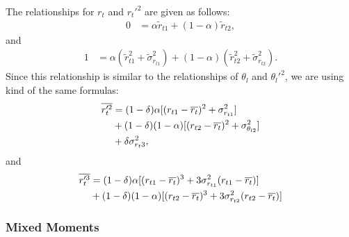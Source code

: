 The relationships for $r_t$ and $r_t'^2$ are given as follows:
\begin{align}
    \label{eq:rt_bar_nondim}
    0 &= \alpha \tilde{r}_{t1} + (1 - \alpha) \tilde{r}_{t2},
\end{align}
and
\begin{align}
    \label{rtptwo_nondim}
    1 &= \alpha \left( \tilde{r}_{t1}^2 + \tilde{\sigma}_{r_{t1}}^2 \right) + (1 - \alpha) \left( \tilde{r}_{t2}^2 + \tilde{\sigma}_{r_{t2}}^2 \right).
\end{align}
Since this relationship is similar to the relationships of $\theta_l$ and $\theta_l'^2$, we are using kind of the same formulas:
\begin{align}
    \label{eq:r_t_prime_2_bar}
    \overline{r_t'^2}
    &= (1 - \delta) \alpha [(r_{t1} - \overline{r_t})^2 + \sigma_{r_{t1}}^2] \nonumber\\
    &+ (1 - \delta) (1 - \alpha) [(r_{t2} - \overline{r_t})^2 + \sigma_{\theta_{l2}}^2] \nonumber\\
    &+ \delta \sigma_{r_t 3}^2,
\end{align}
and
\begin{align}
    \label{eq:r_t_prime_3_bar}
    \overline{r_t'^3}
    &= (1 - \delta) \alpha [(r_{t1} - \overline{r_t})^3 + 3 \sigma_{r_{t1}}^2 (r_{t1} - \overline{r_t})] \nonumber\\
    &+ (1 - \delta) (1 - \alpha) [(r_{t2} - \overline{r_t})^3 + 3 \sigma_{r_{t2}}^2 (r_{t2} - \overline{r_t})]
\end{align}

\subsubsection{Mixed Moments}\label{subsubsec:lowerordermoments_mixed}

